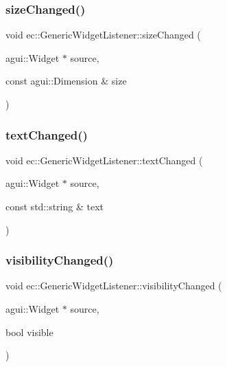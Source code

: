 \subsubsection{\texorpdfstring{size\+Changed()}{sizeChanged()}}
{\footnotesize\ttfamily void ec\+::\+Generic\+Widget\+Listener\+::size\+Changed (\begin{DoxyParamCaption}\item[{agui\+::\+Widget $\ast$}]{source,  }\item[{const agui\+::\+Dimension \&}]{size }\end{DoxyParamCaption})\hspace{0.3cm}{\ttfamily [override]}}

\mbox{\label{classec_1_1_generic_widget_listener_a9be71b4dbb023b6e247427326e73b760}} 
\subsubsection{\texorpdfstring{text\+Changed()}{textChanged()}}
{\footnotesize\ttfamily void ec\+::\+Generic\+Widget\+Listener\+::text\+Changed (\begin{DoxyParamCaption}\item[{agui\+::\+Widget $\ast$}]{source,  }\item[{const std\+::string \&}]{text }\end{DoxyParamCaption})\hspace{0.3cm}{\ttfamily [override]}}

\mbox{\label{classec_1_1_generic_widget_listener_a6f9e7db28e619ab8c538152972fe6c97}} 
\subsubsection{\texorpdfstring{visibility\+Changed()}{visibilityChanged()}}
{\footnotesize\ttfamily void ec\+::\+Generic\+Widget\+Listener\+::visibility\+Changed (\begin{DoxyParamCaption}\item[{agui\+::\+Widget $\ast$}]{source,  }\item[{bool}]{visible }\end{DoxyParamCaption})\hspace{0.3cm}{\ttfamily [override]}}



